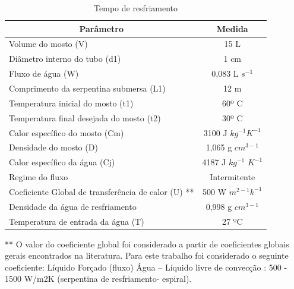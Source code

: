 \begin{enumerate}
\begin{table}[h]
\centering
\begin{tabular}{|l|c|}
\hline
\multicolumn{1}{|c|}{Parâmetro}                     & Medida                                                        \\ \hline
Volume do mosto (V)                                 & 15 L                                                          \\ \hline
Diâmetro interno do tubo (d1)                       & 1 cm                                                          \\ \hline
Fluxo de água (W)                                   & 0,083 L \(s^{-1}\)									                          \\ \hline
Comprimento da serpentina submersa (L1)             & 12 m                                                          \\ \hline
Temperatura inicial do mosto (t1)                   & 60º C                                                         \\ \hline
Temperatura final desejada do mosto (t2)            & 30º C                                                         \\ \hline
Calor específico do mosto (Cm)                      & 3100 J \(kg^{-1} K^{-1}\) 																		\\ \hline
Densidade do mosto (D)                              & 1,065 g \(cm^{3-1}\)                      									  \\ \hline
Calor específico da água (Cj)                       & 4187 J \(kg^{-1}\) \(K^{-1}\) 																		\\ \hline
Regime do fluxo                                     & Intermitente                                                  \\ \hline
Coeficiente Global de transferência de calor (U) ** & 500 W \(m^{2-1} k^{-1}\)      																		\\ \hline
Densidade da água de resfriamento                   & 0,998 g \(cm^{3-1}\)                        									\\ \hline
Temperatura de entrada da água (T)                  & 27 ºC                                                         \\ \hline
\end{tabular}
\caption{Tempo de resfriamento}
\label{resfriamento}
\end{table}

** O valor do coeficiente global foi considerado a partir de coeficientes globais gerais encontrados na literatura. Para este trabalho foi considerado o seguinte coeficiente: Líquido Forçado (fluxo) Água – Líquido livre de convecção : 500 - 1500 W/m2K (serpentina de resfriamento- espiral).


\end{enumerate}
